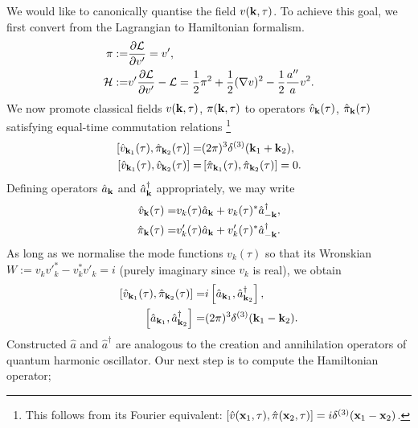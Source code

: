 We would like to canonically quantise the field $v(\mathbf{k},\tau)$. To achieve this goal, we first convert from the Lagrangian to Hamiltonian formalism.
\begin{align}
	\pi :=& \frac{\partial \mathcal{L}}{\partial v'} = v', \\
	\mathcal{H} :=& v'\frac{\partial \mathcal{L}}{\partial v'} - \mathcal{L} = \frac{1}{2} \pi^2 + \frac{1}{2} (\nabla v)^2 - \frac{1}{2} \frac{a''}{a} v^2 .
\end{align}
We now promote classical fields $v(\mathbf{k},\tau)$, $\pi(\mathbf{k},\tau)$ to operators $\hat{v}_\mathbf{k}(\tau)$, $\hat{\pi}_\mathbf{k}(\tau)$ satisfying equal-time commutation relations \footnote{This follows from its Fourier equivalent: $[\hat{v}(\mathbf{x}_1,\tau),\hat{\pi}(\mathbf{x}_2,\tau)] = i\delta^{(3)}(\mathbf{x}_1 - \mathbf{x}_2)$.}
\begin{align}
	\left[ \hat{v}_{\mathbf{k}_1}(\tau), \hat{\pi}_{\mathbf{k}_2}(\tau) \right] =& (2\pi)^3 \delta^{(3)}(\mathbf{k}_1 + \mathbf{k}_2), \\
	\left[ \hat{v}_{\mathbf{k}_1}(\tau), \hat{v}_{\mathbf{k}_2}(\tau) \right] =& \left[ \hat{\pi}_{\mathbf{k}_1}(\tau), \hat{\pi}_{\mathbf{k}_2}(\tau) \right] = 0.
\end{align}
Defining operators $\hat{a}_\mathbf{k}$ and $\hat{a}_\mathbf{k}^\dagger$ appropriately, we may write
\begin{align}
	\hat{v}_\mathbf{k} (\tau) =& v_k(\tau) \hat{a}_\mathbf{k} + v_k(\tau)^* \hat{a}_{-\mathbf{k}}^\dagger,  \\
	\hat{\pi}_\mathbf{k} (\tau) =& {v'_k}(\tau) \hat{a}_\mathbf{k} + {v'_k}(\tau)^* \hat{a}_{-\mathbf{k}}^\dagger.
\end{align}
As long as we normalise the mode functions $v_k(\tau)$ so that its Wronskian $W := v_k v'^*_k - v_k^* v'_k = i$ (purely imaginary since $v_k$ is real), we obtain
\begin{align}
	\left[ \hat{v}_{\mathbf{k}_1}(\tau), \hat{\pi}_{\mathbf{k}_2}(\tau) \right] =& i \left[ \hat{a}_{\mathbf{k}_1}, \hat{a}^\dagger_{\mathbf{k}_2} \right], \\
	\left[ \hat{a}_{\mathbf{k}_1}, \hat{a}^\dagger_{\mathbf{k}_2} \right] =& (2\pi)^3 \delta^{(3)}(\mathbf{k}_1 - \mathbf{k}_2).	\label{eqn:canonical_quantisation_commutation_relation_a}
\end{align}
Constructed $\hat{a}$ and $\hat{a}^\dagger$ are analogous to the creation and annihilation operators of quantum harmonic oscillator. Our next step is to compute the Hamiltonian operator;

